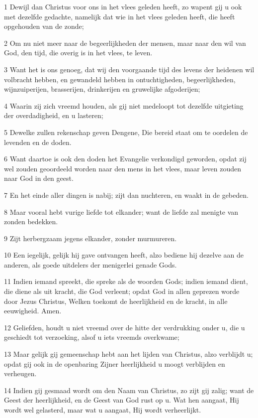\par 1 Dewijl dan Christus voor ons in het vlees geleden heeft, zo wapent gij u ook met dezelfde gedachte, namelijk dat wie in het vlees geleden heeft, die heeft opgehouden van de zonde;
\par 2 Om nu niet meer naar de begeerlijkheden der mensen, maar naar den wil van God, den tijd, die overig is in het vlees, te leven.
\par 3 Want het is ons genoeg, dat wij den voorgaande tijd des levens der heidenen wil volbracht hebben, en gewandeld hebben in ontuchtigheden, begeerlijkheden, wijnzuiperijen, brasserijen, drinkerijen en gruwelijke afgoderijen;
\par 4 Waarin zij zich vreemd houden, als gij niet medeloopt tot dezelfde uitgieting der overdadigheid, en u lasteren;
\par 5 Dewelke zullen rekenschap geven Dengene, Die bereid staat om te oordelen de levenden en de doden.
\par 6 Want daartoe is ook den doden het Evangelie verkondigd geworden, opdat zij wel zouden geoordeeld worden naar den mens in het vlees, maar leven zouden naar God in den geest.
\par 7 En het einde aller dingen is nabij; zijt dan nuchteren, en waakt in de gebeden.
\par 8 Maar vooral hebt vurige liefde tot elkander; want de liefde zal menigte van zonden bedekken.
\par 9 Zijt herbergzaam jegens elkander, zonder murmureren.
\par 10 Een iegelijk, gelijk hij gave ontvangen heeft, alzo bediene hij dezelve aan de anderen, als goede uitdelers der menigerlei genade Gods.
\par 11 Indien iemand spreekt, die spreke als de woorden Gods; indien iemand dient, die diene als uit kracht, die God verleent; opdat God in allen geprezen worde door Jezus Christus, Welken toekomt de heerlijkheid en de kracht, in alle eeuwigheid. Amen.
\par 12 Geliefden, houdt u niet vreemd over de hitte der verdrukking onder u, die u geschiedt tot verzoeking, alsof u iets vreemds overkwame;
\par 13 Maar gelijk gij gemeenschap hebt aan het lijden van Christus, alzo verblijdt u; opdat gij ook in de openbaring Zijner heerlijkheid u moogt verblijden en verheugen.
\par 14 Indien gij gesmaad wordt om den Naam van Christus, zo zijt gij zalig; want de Geest der heerlijkheid, en de Geest van God rust op u. Wat hen aangaat, Hij wordt wel gelasterd, maar wat u aangaat, Hij wordt verheerlijkt.
